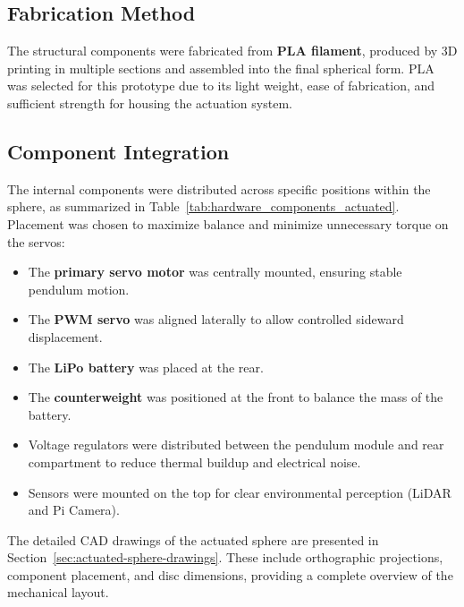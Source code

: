 \documentclass[english, bachelor, utf8]{base/thesis_telematics}
\begin{document}
\subsection{Fabrication Method}
The structural components were fabricated from \textbf{PLA filament}, produced by 3D printing in multiple sections and assembled into the final spherical form. PLA was selected for this prototype due to its light weight, ease of fabrication, and sufficient strength for housing the actuation system.  

\subsection{Component Integration}
The internal components were distributed across specific positions within the sphere, as summarized in Table~\ref{tab:hardware_components_actuated}. Placement was chosen to maximize balance and minimize unnecessary torque on the servos:  

\begin{itemize}
    \item The \textbf{primary servo motor} was centrally mounted, ensuring stable pendulum motion.  
    \item The \textbf{PWM servo} was aligned laterally to allow controlled sideward displacement.  
    \item The \textbf{LiPo battery} was placed at the rear.
    \item The \textbf{counterweight} was positioned at the front to balance the mass of the battery.
    \item Voltage regulators were distributed between the pendulum module and rear compartment to reduce thermal buildup and electrical noise.  
    \item Sensors were mounted on the top for clear environmental perception (LiDAR and Pi Camera).  
\end{itemize}

The detailed CAD drawings of the actuated sphere are presented in Section~\ref{sec:actuated-sphere-drawings}.
These include orthographic projections, component placement, and disc dimensions, providing a complete overview of the mechanical layout.  
\end{document}
